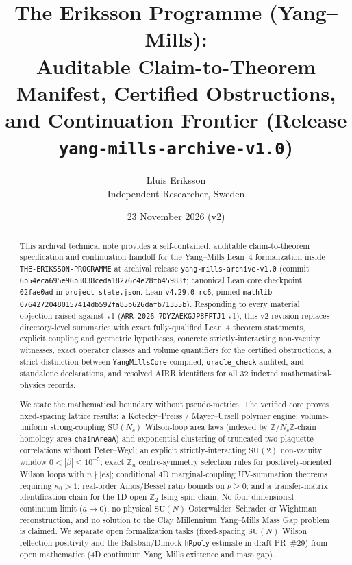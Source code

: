 \documentclass[11pt]{article}
\title{The Eriksson Programme (Yang--Mills):\\
Auditable Claim-to-Theorem Manifest, Certified Obstructions,\\
and Continuation Frontier (Release \texttt{yang-mills-archive-v1.0})}
\author{Lluis Eriksson\\
\small Independent Researcher, Sweden}
\date{23 November 2026 (v2)}
\newcommand{\Z}{\mathbb{Z}}
\begin{document}
\maketitle

\begin{abstract}
This archival technical note provides a self-contained, auditable claim-to-theorem
specification and continuation handoff for the Yang--Mills Lean~4 formalization inside
\texttt{THE-ERIKSSON-PROGRAMME} at archival release \texttt{yang-mills-archive-v1.0}
(commit \texttt{6b54eca695e96b3038ceda18276c4e28fb45983f}; canonical Lean core checkpoint
\texttt{02fae0ad} in \texttt{project-state.json}, Lean \texttt{v4.29.0-rc6}, pinned
\texttt{mathlib} \texttt{07642720480157414db592fa85b626dafb71355b}). Responding to every
material objection raised against v1 (\texttt{ARR-2026-7DYZAEKGJP8FPTJ1} v1), this v2
revision replaces directory-level summaries with exact fully-qualified Lean~4 theorem
statements, explicit coupling and geometric hypotheses, concrete strictly-interacting
non-vacuity witnesses, exact operator classes and volume quantifiers for the certified
obstructions, a strict distinction between \texttt{YangMillsCore}-compiled,
\texttt{oracle\_check}-audited, and standalone declarations, and resolved AIRR identifiers
for all 32 indexed mathematical-physics records.

We state the mathematical boundary without pseudo-metrics. The verified core proves
fixed-spacing lattice results: a Koteck\'y--Preiss / Mayer--Ursell polymer engine;
volume-uniform strong-coupling $\mathrm{SU}(N_c)$ Wilson-loop area laws (indexed by
$\mathbb{Z}/N_c\mathbb{Z}$-chain homology area \texttt{chainAreaA}) and exponential
clustering of truncated two-plaquette correlations without Peter--Weyl; an explicit
strictly-interacting $\mathrm{SU}(2)$ non-vacuity window $0 < |\beta| \le 10^{-5}$; exact
$\mathbb{Z}_n$ centre-symmetry selection rules for positively-oriented Wilson loops with
$n \nmid |es|$; conditional 4D marginal-coupling UV-summation theorems requiring
$\kappa_0 > 1$; real-order Amos/Bessel ratio bounds on $\nu \ge 0$; and a transfer-matrix
identification chain for the 1D open $\Z_2$ Ising spin chain. No four-dimensional
continuum limit ($a \to 0$), no physical $\mathrm{SU}(N)$ Osterwalder--Schrader or
Wightman reconstruction, and no solution to the Clay Millennium Yang--Mills Mass Gap
problem is claimed. We separate open formalization tasks (fixed-spacing $\mathrm{SU}(N)$
Wilson reflection positivity and the Balaban/Dimock \texttt{hRpoly} estimate in draft
PR~\#29) from open mathematics (4D continuum Yang--Mills existence and mass gap).
\end{abstract}
\end{document}
